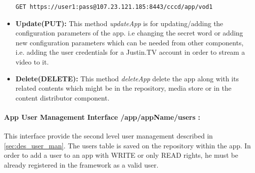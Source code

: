 \begin{itemize}
\begin{code}
\begin{verbatim}
GET https://user1:pass@107.23.121.185:8443/cccd/app/vod1
\end{verbatim}
\end{code}

\item \textbf{Update(PUT):}  This method \textit{updateApp} is for updating/adding the configuration parameters of the app. i.e changing the secret word or adding new configuration parameters which can be needed from other components, i.e. adding the user credentials for a Justin.TV account in order to stream a video to it.

\item \textbf{Delete(DELETE):} This method \textit{deleteApp} delete the app along with its related contents which might be in the repository, media store or in the content distributor component.

\end{itemize}

\paragraph{App User Management Interface /app/{appName}/users :} This interface provide the second level user management described in \ref{sec:des_user_man}. The users table is saved on the repository within the app. In order to add a user to an app with WRITE or only READ rights, he must be already registered in the framework as a valid user.

